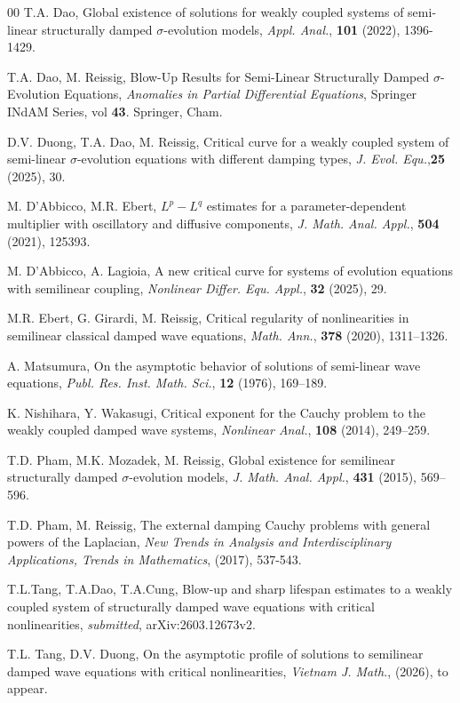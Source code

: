 \documentclass[11pt,reqno]{amsart}
\numberwithin{equation}{section}
\begin{document}
\begin{thebibliography}{00}
 T.A. Dao, Global existence of solutions for weakly coupled systems of semi-linear structurally damped $\sigma$-evolution models, {\it Appl. Anal.}, \textbf{101} (2022), 1396-1429.

 T.A. Dao, M. Reissig, Blow-Up Results for Semi-Linear Structurally Damped $\sigma$-Evolution Equations, {\it Anomalies in Partial Differential Equations}, Springer INdAM Series, vol {\bf 43}. Springer, Cham.

 D.V. Duong, T.A. Dao, M. Reissig, Critical curve for a weakly coupled system of semi-linear $\sigma$-evolution equations with different damping types, {\it J. Evol. Equ.},\textbf{25} (2025), 30.

M. D’Abbicco, M.R. Ebert, $L^p-L^q$ estimates for a parameter-dependent multiplier with oscillatory and diffusive components, {\it J. Math. Anal. Appl.}, {\bf504} (2021), 125393.

 M. D’Abbicco, A. Lagioia, A new critical curve for systems of evolution equations with semilinear coupling, \textit{Nonlinear Differ. Equ. Appl.}, {\bf32} (2025), 29.

 M.R. Ebert, G. Girardi, M. Reissig, Critical regularity of nonlinearities in semilinear classical damped wave equations, {\it Math. Ann.}, {\bf378} (2020), 1311–1326.

 A. Matsumura, On the asymptotic behavior of solutions of semi-linear wave equations, {\it Publ. Res. Inst. Math. Sci.}, {\bf12} (1976), 169–189.

 K. Nishihara, Y. Wakasugi, Critical exponent for the Cauchy problem to the weakly coupled damped wave systems, \textit{Nonlinear Anal.}, \textbf{108} (2014), 249–259.

 T.D. Pham, M.K. Mozadek, M. Reissig, Global existence for semilinear structurally damped $\sigma$-evolution models, \textit{J. Math. Anal. Appl.}, {\bf431} (2015), 569–596.

 T.D. Pham, M. Reissig, The external damping Cauchy problems with general powers of the Laplacian, {\it New Trends in Analysis and Interdisciplinary Applications, Trends in Mathematics}, (2017), 537-543.

 T.L.Tang, T.A.Dao, T.A.Cung, Blow-up and sharp lifespan estimates to a weakly coupled system of structurally damped wave equations with critical nonlinearities, \textit{submitted}, arXiv:2603.12673v2.

 T.L. Tang, D.V. Duong, On the asymptotic profile of solutions to semilinear damped wave equations with critical nonlinearities, \textit{Vietnam J. Math.}, (2026), to appear.

\end{thebibliography}
\end{document}

